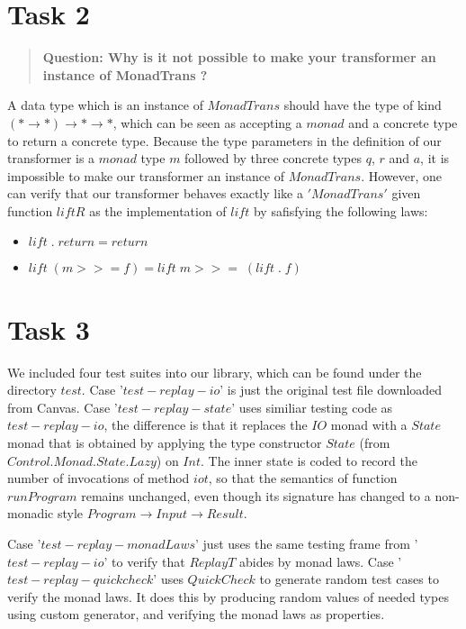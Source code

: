 \documentclass[10pt]{article}
\begin{document}
\section*{Task 2}
\begin{quote}                                                                                                                                                                                 
\textbf{Question: Why is it not possible to make your transformer an instance of MonadTrans ?}                                                                                      
\end{quote}
A data type which is an instance of $MonadTrans$ should have the type of kind $(* \to *) \to * \to *$, which can be seen as accepting a $monad$ and a concrete type to return a concrete type. Because the type parameters in the definition of our transformer is a $monad$ type $m$ followed by three concrete types $q$, $r$ and $a$, it is impossible to make our transformer an instance of $MonadTrans$. However, one can verify that our transformer behaves exactly like a $'MonadTrans'$ given function $liftR$ as the implementation of $lift$ by safisfying the following laws:
\begin{itemize}
\item $lift\; .\; return = return$
\item $lift\; (m >>= f) = lift\; m  >>=\;  (lift\; .\; f)$
\end{itemize}
\section*{Task 3}
We included four test suites into our library, which can be found under the directory $test$. Case '$test-replay-io$' is just the original test file downloaded from Canvas. Case '$test-replay-state$' uses similiar testing code as $test-replay-io$, the difference is that it replaces the $IO$ monad with a $State$ monad that is obtained by applying the type constructor $State$ (from $Control.Monad.State.Lazy$) on $Int$. The inner state is coded to record the number of invocations of method $iot$, so that the semantics of function $runProgram$ remains unchanged, even though its signature has changed to a non-monadic style $Program \to Input \to Result$. 

Case '$test-replay-monadLaws$' just uses the same  testing frame from '$test-replay-io$' to verify that $ReplayT$ abides by monad laws. Case '$test-replay-quickcheck$' uses $QuickCheck$ to generate random test cases to verify the monad laws. It does this by producing random values of needed types using custom generator, and verifying the monad laws as properties. 
\end{document}
